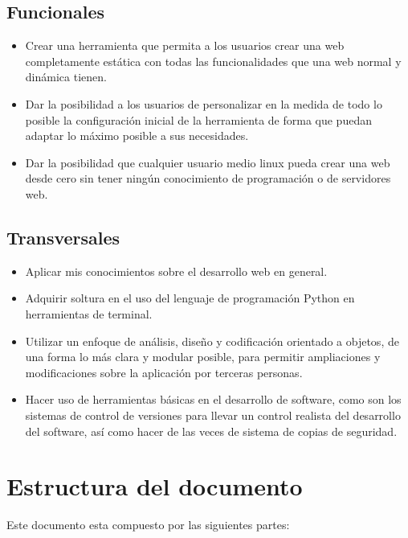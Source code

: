 \subsection{Funcionales}
\begin{itemize}
\item Crear una herramienta que permita a los usuarios crear una web completamente estática
con todas las funcionalidades que una web normal y dinámica tienen.
\item Dar la posibilidad a los usuarios de personalizar en la medida de todo lo posible la configuración
inicial de la herramienta de forma que puedan adaptar lo máximo posible a sus necesidades.
\item Dar la posibilidad que cualquier usuario medio linux pueda crear una web desde cero sin tener
ningún conocimiento de programación o de servidores web.
\end{itemize}

\subsection{Transversales}
\begin{itemize}
\item Aplicar mis conocimientos sobre el desarrollo web en general.
\item Adquirir soltura en el uso del lenguaje de programación Python en herramientas de terminal.
\item Utilizar un enfoque de análisis, diseño y codificación orientado a objetos,
de una forma lo más clara y modular posible, para permitir ampliaciones y
modificaciones sobre la aplicación por terceras personas.
\item Hacer uso de herramientas básicas en el desarrollo de software, como son los
sistemas de control de versiones para llevar un control realista del desarrollo
del software, así como hacer de las veces de sistema de copias de seguridad.
\end{itemize}

\section{Estructura del documento}

Este documento esta compuesto por las siguientes partes:

